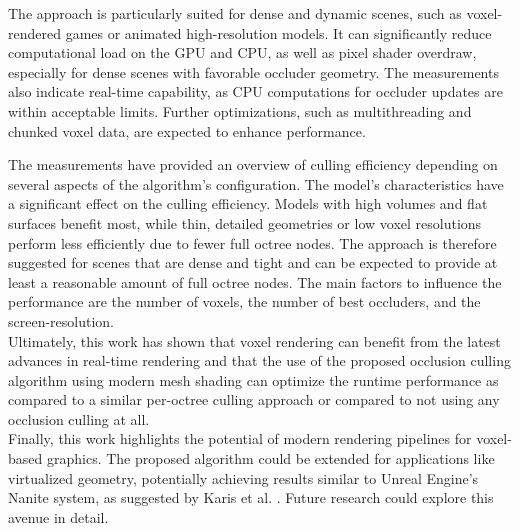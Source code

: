\noindent
The approach is particularly suited for dense and dynamic scenes, such as voxel-rendered 
games or animated high-resolution models. It can significantly reduce computational load 
on the \ac{GPU} and \ac{CPU}, as well as pixel shader overdraw, especially for dense scenes with 
favorable occluder geometry. The measurements also indicate real-time capability, as 
\ac{CPU} computations for occluder updates are within acceptable limits. Further 
optimizations, such as multithreading and chunked voxel data, are expected to enhance 
performance.


\noindent
The measurements have provided an overview of culling efficiency depending on several 
aspects of the algorithm's configuration. The model's characteristics have a significant 
effect on the culling efficiency. Models with high volumes and flat surfaces benefit most, 
while thin, detailed geometries or low voxel resolutions perform less efficiently due 
to fewer full octree nodes. The approach is therefore suggested for scenes that are dense 
and tight and can be expected to provide at least a reasonable amount of full octree nodes. 
The main factors to influence the performance are the number of voxels, the number of 
best occluders, and the screen-resolution.\\



\noindent
Ultimately, this work has shown that voxel rendering can benefit from the latest advances 
in real-time rendering and that the use of the proposed occlusion culling algorithm 
using modern mesh shading can optimize the runtime performance as compared to a similar 
per-octree culling approach or compared to not using any occlusion culling at all. \\

\noindent
Finally, this work highlights the potential of modern rendering pipelines for voxel-based 
graphics. The proposed algorithm could be extended for applications like virtualized 
geometry, potentially achieving results similar to Unreal Engine's Nanite system, as 
suggested by Karis et al. \cite{Karis2021}. Future research could explore this avenue 
in detail.
